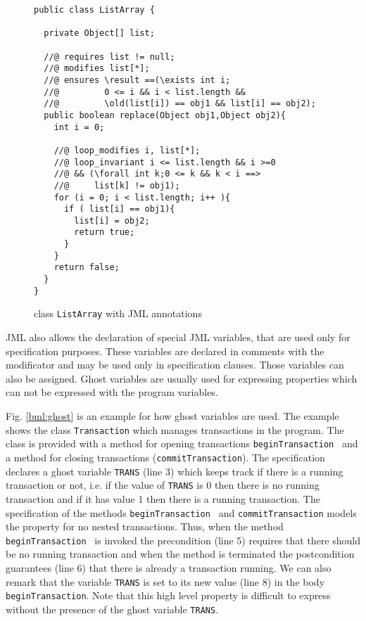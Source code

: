 \lstset{numbers=left,numberstyle=\small,stepnumber=1,numbersep=5pt}
\begin{figure}[ht!]
\begin{lstlisting}[frame=trbl] 
public class ListArray {
  
  private Object[] list;
  
  //@ requires list != null;
  //@ modifies list[*];
  //@ ensures \result ==(\exists int i; 
  //@         0 <= i && i < list.length && 
  //@         \old(list[i]) == obj1 && list[i] == obj2);
  public boolean replace(Object obj1,Object obj2){
    int i = 0;
    
    //@ loop_modifies i, list[*];
    //@ loop_invariant i <= list.length && i >=0 
    //@ && (\forall int k;0 <= k && k < i ==> 
    //@     list[k] != obj1);
    for (i = 0; i < list.length; i++ ){
      if ( list[i] == obj1){
        list[i] = obj2;
        return true;	
      }
    }
    return false;
  }
}
\end{lstlisting}
\caption{\sc class \mbox{\rm \lstinline!ListArray!} with JML annotations} 
\label{replaceSrc}
\end{figure}

 JML also allows the declaration of special JML variables, that are used only for specification purposes. 
 These variables are declared in comments with the  modificator and may be used only in specification clauses. Those variables 
 can also be assigned. Ghost variables are usually used  for expressing properties which can not be expressed with the program variables.

 Fig. \ref{bml:ghost} is an example for how ghost variables are used. The example shows the class \texttt{Transaction}
 which manages transactions in the program. The class is provided with a method for opening transactions \texttt{beginTransaction } and 
 a method for closing transactions (\texttt{commitTransaction}).  The specification declares a ghost variable
 \texttt{TRANS} (line 3) which keeps track if there is  a running transaction or not, i.e. if the value of  \texttt{TRANS} is 0
 then there is no running transaction and if it has value 1 then there is
 a running transaction. The specification of the methods \texttt{beginTransaction } and \texttt{commitTransaction}
 models the property for no nested transactions. Thus, when the method  \texttt{beginTransaction } is invoked the precondition (line 5) requires
 that there should be no running transaction and when the method is terminated the postcondition guarantees (line 6) that there is already a transaction running.
 We can also remark that the variable  \texttt{TRANS} is set to its new value (line 8) in the  body  \texttt{beginTransaction}.
 Note that this high level property is difficult to express without the presence
 of the ghost variable \texttt{TRANS}.  

